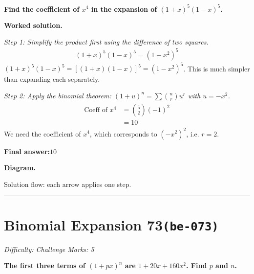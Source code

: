 \documentclass[11pt]{article}
\newcommand{\question}[1]{\par\medskip\noindent\textbf{#1}\par}
\begin{document}
\question{Find the coefficient of \( x^4 \) in the expansion of \( (1 + x)^5(1 - x)^5 \).}

\textbf{Worked solution.}

\textit{Step 1: Simplify the product first using the difference of two squares.}
\[\begin{gathered}
(1+x)^5(1-x)^5 = (1-x^2)^5
\end{gathered}\]
\((1+x)^5(1-x)^5 = [(1+x)(1-x)]^5 = (1-x^2)^5\). This is much simpler than expanding each separately.

\textit{Step 2: Apply the binomial theorem: \((1+u)^n = \sum \binom{n}{r} u^r\) with \(u = -x^2\).}
\[\begin{gathered}
\begin{aligned} \text{Coeff of } x^4 &= \binom{5}{2}(-1)^2 \\ &= 10 \end{aligned}
\end{gathered}\]
We need the coefficient of \(x^4\), which corresponds to \((-x^2)^2\), i.e. \(r = 2\).

\begin{answerbox}
\textbf{Final answer:}\quad \(\displaystyle 10\)
\end{answerbox}
\textbf{Diagram.}

\begin{center}
\end{center}
\small Solution flow: each arrow applies one step.\normalsize

\medskip\hrule

\section*{Binomial Expansion 73\quad\small\texttt{(be-073)}}
\textit{Difficulty: Challenge \quad\textbar\quad Marks: 5}

\question{The first three terms of \( (1 + px)^n \) are \( 1 + 20x + 160x^2 \). Find \( p \) and \( n \).}
\end{document}

